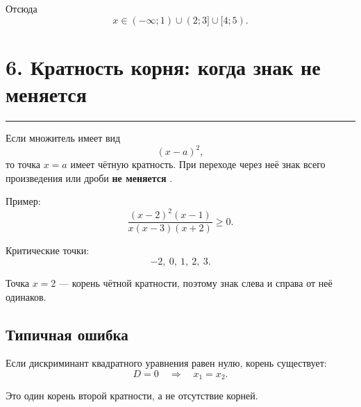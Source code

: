 \documentclass[a4paper,12pt]{article}
\newcommand{\topicsection}[1]{%
    \section*{\textcolor{darkaccent}{#1}}%
    \vspace{-0.4em}%
    \textcolor{accent}{\rule{\linewidth}{0.7pt}}%
    \vspace{0.4em}%
}
\newcommand{\key}[1]{%
    \textcolor{darkaccent}{\textbf{#1}}%
}
\begin{document}
Отсюда
\[
\boxed{
x\in
(-\infty;1)
\cup
(2;3]
\cup
[4;5)
}.
\]

\topicsection{6. Кратность корня: когда знак не меняется}

Если множитель имеет вид
\[
(x-a)^2,
\]
то точка \(x=a\) имеет чётную кратность. При переходе через неё знак всего произведения или дроби \key{не меняется}.

Пример:
\[
\frac{(x-2)^2(x-1)}
     {x(x-3)(x+2)}
\ge 0.
\]

Критические точки:
\[
-2,\ 0,\ 1,\ 2,\ 3.
\]

Точка \(x=2\) --- корень чётной кратности, поэтому знак слева и справа от неё одинаков.

\subsection*{Типичная ошибка}

Если дискриминант квадратного уравнения равен нулю, корень существует:
\[
D=0
\quad\Longrightarrow\quad
x_1=x_2.
\]

Это один корень второй кратности, а не отсутствие корней.


\clearpage
\thispagestyle{empty}
\end{document}

